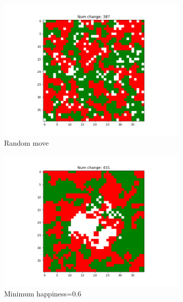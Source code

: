 \documentclass[11pt]{article}
\begin{document}
	\vspace{-2em} %
	\begin{figure}[h]
		\centering
		\begin{subfigure}{0.14\textwidth}
			\includegraphics[width=\linewidth]{final_random.png}
			\caption{\centering Random move}
			\label{distance_finalrandom}
		\end{subfigure}\hfill
		\begin{subfigure}{0.14\textwidth}
			\includegraphics[width=\linewidth]{policy4_final_min6.png}
			\caption{\centering Minimum happiness=0.6}
			\label{distance_finalmin6}
		\end{subfigure}\hfill
		\begin{subfigure}{0.14\textwidth}

\end{subfigure}
\end{figure}
\end{document}
